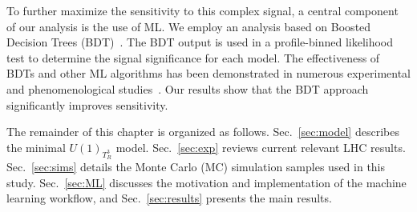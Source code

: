 To further maximize the sensitivity to this complex signal, a central component of our analysis is the use of ML. We employ an analysis based on Boosted Decision Trees (BDT)~\parencite{friedman_greedy_2001}. The BDT output is used in a profile-binned likelihood test to determine the signal significance for each model. The effectiveness of BDTs and other ML algorithms has been demonstrated in numerous experimental and phenomenological studies~\parencite{Ai:2022qvs, ATLAS:2017fak, Biswas:2018snp, Chung:2020ysf, Feng:2021eke, ttZprime, Chigusa:2022svv, Florez2023, Arganda2024, Ajmal_2024, Dutta_2015}. Our results show that the BDT approach significantly improves sensitivity.


The remainder of this chapter is organized as follows. Sec.~\ref{sec:model} describes the minimal $U(1)_{T^3_R}$ model. Sec.~\ref{sec:exp} reviews current relevant LHC results. Sec.~\ref{sec:sims} details the Monte Carlo (MC) simulation samples used in this study. Sec.~\ref{sec:ML} discusses the motivation and implementation of the machine learning workflow, and Sec.~\ref{sec:results} presents the main results.






